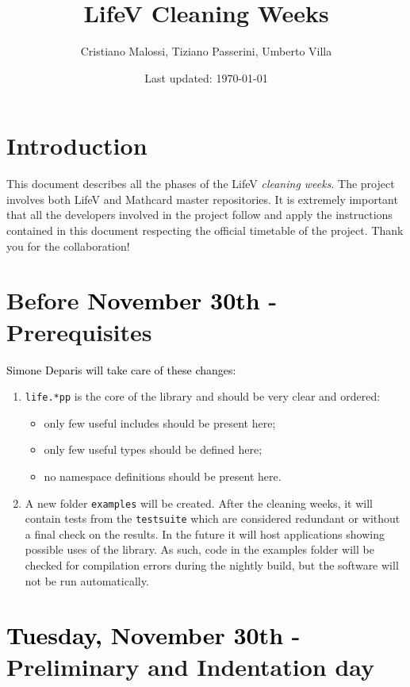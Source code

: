 \documentclass[10p]{article}
\title{\Huge \textbf{LifeV Cleaning Weeks}}
\author{Cristiano Malossi, Tiziano Passerini, Umberto Villa}
\date{Last updated: \today}
\newcommand{\newparts}[1]{\textcolor{black}{#1}}
\theoremstyle{definition}
\begin{document}
 
\maketitle


\section*{Introduction}
This document describes all the phases of the LifeV \emph{cleaning weeks}. The project involves both LifeV and Mathcard master repositories. It is extremely important that all the developers involved in the project follow and apply the instructions contained in this document respecting the official timetable of the project. Thank you for the collaboration!

\section*{Before \newparts{November 30th} - Prerequisites}
\newparts{Simone Deparis will take care of these changes:}
  \begin{enumerate}
\item \texttt{life.*pp} is the core of the library and should be very clear and ordered:
  \begin{itemize}
      \item only few useful includes should be present here; 
      \item only few useful types should be defined here;
      \item no namespace definitions should be present here.
  \end{itemize}
  \item A new folder \texttt{examples} will be created. After the cleaning weeks, it will contain tests from the \texttt{testsuite}
  which are considered redundant or without a final check on the results. In the future it will host applications showing possible
  uses of the library. As such, code in the examples folder will be checked for compilation errors during the nightly build, but
  the software will not be run automatically.
  \end{enumerate}
  
\section*{\newparts{Tuesday, November 30th} - Preliminary and Indentation day}
\end{document}
